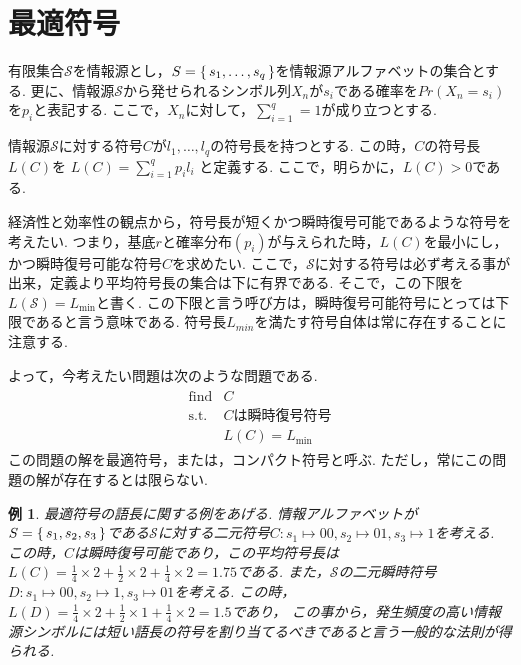 \documentclass[12pt]{ltjsarticle}
\newtheorem{example}{例}
\def \calS {\mathcal{S}}
\begin{document}
\section{最適符号}
有限集合$ \calS $を情報源とし，$S = \set{s_1,\ldots,s_q}$を情報源アルファベットの集合とする.
更に、情報源$\calS$から発せられるシンボル列$X_n$が$s_i$である確率を$Pr(X_n = s_i)$を$p_i$と表記する.
ここで，$X_n$に対して，$\sum_{i = 1}^{q} = 1$が成り立つとする.

情報源$\calS$に対する符号$C$が$l_1,\ldots,l_q$の符号長を持つとする.
この時，$C$の符号長$L(C)$を
\begin{math}
    L(C) = \sum_{i = 1}^{q} p_il_i
\end{math}
と定義する.
ここで，明らかに，$L(C) > 0$である.

経済性と効率性の観点から，符号長が短くかつ瞬時復号可能であるような符号を考えたい.
つまり，基底$r$と確率分布$(p_i)$が与えられた時，$L(C)$を最小にし，かつ瞬時復号可能な符号$C$を求めたい.
ここで，$\calS$に対する符号は必ず考える事が出来，定義より平均符号長の集合は下に有界である.
そこで，この下限を$L(\calS) = L_{\min}$と書く.
この下限と言う呼び方は，瞬時復号可能符号にとっては下限であると言う意味である.
符号長$L_{min}$を満たす符号自体は常に存在することに注意する.

よって，今考えたい問題は次のような問題である.\\
\begin{eqnarray*}
    \begin{array}{ll}
        \mbox{find}& C\\
        \mbox{s.t.}&Cは瞬時復号符号\\
        & L(C) = L_{\min}
    \end{array}
\end{eqnarray*}
この問題の解を最適符号，または，コンパクト符号と呼ぶ.
ただし，常にこの問題の解が存在するとは限らない.

\begin{example}
最適符号の語長に関する例をあげる.
情報アルファベットが$S = \set{s_1,s_2,s_3}$である$\calS$に対する二元符号$C:s_1 \longmapsto 00,s_2 \longmapsto 01,s_3 \longmapsto 1$を考える.
この時，$C$は瞬時復号可能であり，この平均符号長は$L(C) = \frac{1}{4} \times 2 + \frac{1}{2} \times 2 + \frac{1}{4} \times 2 = 1.75$である.
また，$\calS$の二元瞬時符号$D:s_1 \longmapsto 00,s_2 \longmapsto 1,s_3 \longmapsto 01$を考える.
この時，$L(D)  = \frac{1}{4} \times 2 + \frac{1}{2} \times 1 + \frac{1}{4} \times 2 = 1.5$であり，
この事から，発生頻度の高い情報源シンボルには短い語長の符号を割り当てるべきであると言う一般的な法則が得られる.
\end{example}
\end{document}
